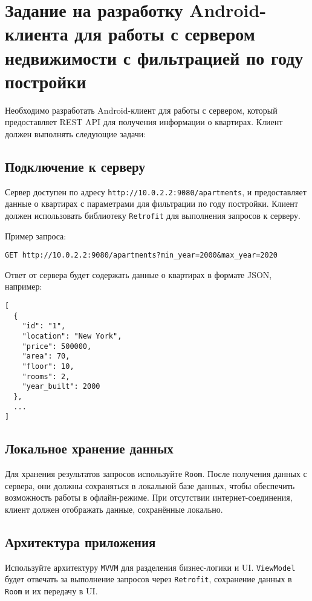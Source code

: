 \section{Задание на разработку Android-клиента для работы с сервером недвижимости с фильтрацией по году постройки}

Необходимо разработать Android-клиент для работы с сервером, который предоставляет REST API для получения информации о квартирах. Клиент должен выполнять следующие задачи:

\subsection{Подключение к серверу}
Сервер доступен по адресу \texttt{http://10.0.2.2:9080/apartments}, и предоставляет данные о квартирах с параметрами для фильтрации по году постройки. Клиент должен использовать библиотеку \texttt{Retrofit} для выполнения запросов к серверу.

Пример запроса:
\begin{verbatim}
GET http://10.0.2.2:9080/apartments?min_year=2000&max_year=2020
\end{verbatim}

Ответ от сервера будет содержать данные о квартирах в формате JSON, например:

\begin{verbatim}
[
  {
    "id": "1",
    "location": "New York",
    "price": 500000,
    "area": 70,
    "floor": 10,
    "rooms": 2,
    "year_built": 2000
  },
  ...
]
\end{verbatim}

\subsection{Локальное хранение данных}
Для хранения результатов запросов используйте \texttt{Room}. После получения данных с сервера, они должны сохраняться в локальной базе данных, чтобы обеспечить возможность работы в офлайн-режиме. При отсутствии интернет-соединения, клиент должен отображать данные, сохранённые локально.

\subsection{Архитектура приложения}
Используйте архитектуру \texttt{MVVM} для разделения бизнес-логики и UI. \texttt{ViewModel} будет отвечать за выполнение запросов через \texttt{Retrofit}, сохранение данных в \texttt{Room} и их передачу в UI.

